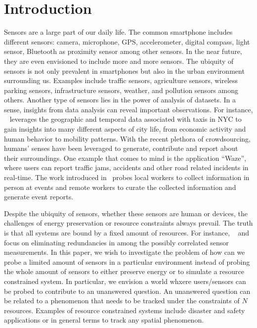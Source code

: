 \documentclass{acm_proc_article-sp}
\begin{document}
\section{Introduction}
Sensors are a large part of our daily life. The common smartphone includes different sensors: camera, microphone, GPS, accelerometer, digital compass, light sensor, Bluetooth as proximity sensor among other sensors. In the near future, they are even envisioned to include more and more sensors. The ubiquity of sensors is not only prevalent in smartphones but also in the urban environment surrounding us. Examples include traffic sensors, agriculture sensors, wireless parking sensors, infrastructure sensors, weather, and pollution sensors among others. Another type of sensors lies in the power of analysis of datasets. In a sense, insights from data analysis can reveal important observations. For instance, ~\cite{ferreira2013visual} leverages the geographic and temporal data associated with taxis in NYC to gain insights into many different aspects of city life, from economic activity and human behavior to mobility patterns. With the recent plethora of crowdsourcing, humans' senses have been leveraged to generate, contribute and report about their surroundings. One example that comes to mind is the application ``Waze'', where users can report traffic jams, accidents and other road related incidents in real-time. The work introduced in~\cite{agapie2015crowdsourcing} probes local workers to collect information in person at events and remote workers to curate the collected information and generate event reports.\par

Despite the ubiquity of sensors, whether these sensors are human or devices, the challenges of energy preservation or resource constraints always prevail. The truth is that all systems are bound by a fixed amount of resources. For instance, ~\cite{marco2003many} and~\cite{pattem2008impact} focus on eliminating redundancies in among the possibly correlated sensor measurements. In this paper, we wish to investigate the problem of how can we probe a limited amount of sensors in a particular environment instead of probing the whole amount of sensors to either preserve energy or to simulate a resource constrained system. In particular, we envision a world whxere users/sensors can be probed to contribute to an unanswered question. An unanswered question can be related to a phenomenon that needs to be tracked under the constraints of $N$ resources. Examples of resource constrained systems include disaster and safety applications or in general terms to track any spatial phenomenon.\par
\end{document}
